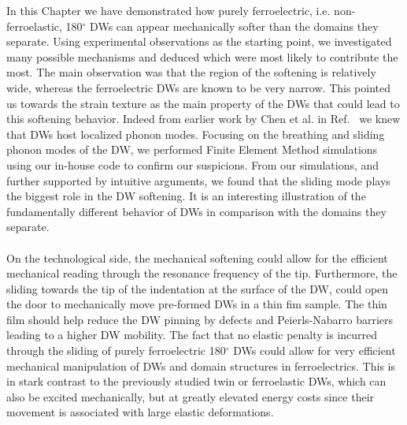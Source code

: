 In this Chapter we have demonstrated how purely ferroelectric, i.e. non-ferroelastic, 180$^\circ$ DWs can appear mechanically softer than the domains they separate.
Using experimental observations as the starting point, we investigated many possible mechanisms and deduced which were most likely to contribute the most.
The main observation was that the region of the softening is relatively wide, whereas the ferroelectric DWs are known to be very narrow.
This pointed us towards the strain texture as the main property of the DWs that could lead to this softening behavior.
Indeed from earlier work by Chen et al. in Ref.~\cite{Chen2020} we knew that DWs host localized phonon modes.
Focusing on the breathing and sliding phonon modes of the DW, we performed Finite Element Method simulations using our in-house code to confirm our suspicions.
From our simulations, and further supported by intuitive arguments, we found that the sliding mode plays the biggest role in the DW softening.
It is an interesting illustration of the fundamentally different behavior of DWs in comparison with the domains they separate.
\\\\
On the technological side, the mechanical softening could allow for the efficient mechanical reading through the resonance frequency of the tip.
Furthermore, the sliding towards the tip of the indentation at the surface of the DW, could open the door to mechanically move pre-formed DWs in a thin fim sample.
The thin film should help reduce the DW pinning by defects and Peierls-Nabarro barriers leading to a higher DW mobility.
The fact that no elastic penalty is incurred through the sliding of purely ferroelectric 180$^\circ$ DWs could allow for very efficient mechanical manipulation of DWs and domain structures in ferroelectrics.
This is in stark contrast to the previously studied twin or ferroelastic DWs, which can also be excited mechanically, but at greatly elevated energy costs since their movement is associated with large elastic deformations.
